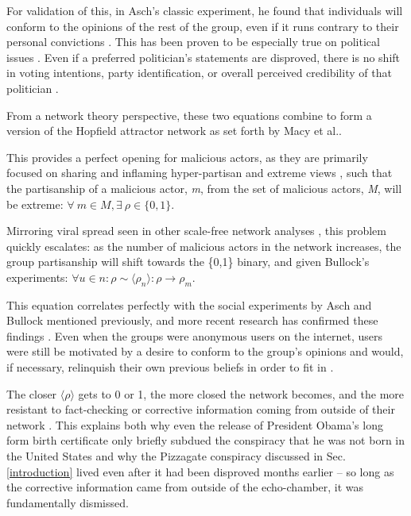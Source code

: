 \documentclass[preprint,review,12pt]{elsarticle}
\begin{document}
 For validation of this, in Asch's classic experiment, he found that individuals will conform to the opinions of the rest of the group, even if it runs contrary to their personal convictions \cite{asch1956studies}. This has been proven to be especially true on political issues  \cite{bullock2007experiments,housholder2014facebook}. Even if a preferred politician's statements are disproved, there is no shift in voting intentions, party identification, or overall perceived credibility of that politician \cite{swire2017processing}. 
 
 From a network theory perspective, these two equations combine to form a version of the Hopfield attractor network \cite{hopfield1982neural,hopfield1985neural,nowak1998toward,kitts1999structural} as set forth by Macy et al.\cite{macy2003polarization}. 
 
This provides a perfect opening for malicious actors, as they are primarily focused on sharing and inflaming hyper-partisan and extreme views \cite{shin2018diffusion,bastos2019brexit,hegelich2016social,mueller2019mueller}, such that the partisanship of a malicious actor, \textit{m}, from the set of malicious actors, \textit{M}, will be extreme: $\forall \ m \in M, \exists \ \rho \in \{0,1\}$.

Mirroring viral spread seen in other scale-free network analyses \cite{pastor2001epidemic,cohen2003efficient}, this problem quickly escalates: as the number of malicious actors in the network increases, the group partisanship will shift towards the \{0,1\} binary, and given Bullock's experiments: $\forall u \in n: \rho \sim \langle \rho_n \rangle: \rho \rightarrow \rho_m$.

This equation correlates perfectly with the social experiments by Asch and Bullock mentioned previously, and more recent research has confirmed these findings \cite{colliander2019fake,edelson2011following}. Even when the groups were anonymous users on the internet, users were still be motivated by a desire to conform to the group's opinions and would, if necessary, relinquish their own previous beliefs in order to fit in \cite{williams2000cyberostracism,zhu2012switch,tsikerdekis2013effects,breitsohl2015groupthink,winter2015they,hamilton2017s}. 

The closer $\langle \rho \rangle$ gets to 0 or 1, the more closed the network becomes, and the more resistant to fact-checking or corrective information coming from outside of their network \cite{garrett2013undermining,lord1979biased,edwards1996disconfirmation,redlawsk2002hot, taber2006motivated}. This explains both why even the release of President Obama's long form birth certificate only briefly subdued the conspiracy that he was not born in the United States \cite{nyhan2012new} and why the Pizzagate conspiracy discussed in Sec. \ref{introduction} lived even after it had been disproved months earlier -- so long as the corrective information came from outside of the echo-chamber, it was fundamentally dismissed.
\end{document}
